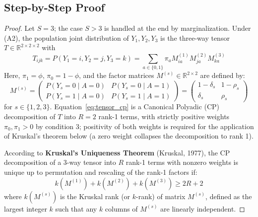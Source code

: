 \documentclass[11pt,a4paper]{article}
\begin{document}
\subsection{Step-by-Step Proof}
\begin{proof}
Let $S = 3$; the case $S > 3$ is handled at the end by marginalization. Under (A2), the population joint distribution of $Y_1, Y_2, Y_3$ is the three-way tensor $T \in \mathbb{R}^{2 \times 2 \times 2}$ with
\begin{equation}\label{eq:tensor_cp}
T_{ijk} = P(Y_1=i, Y_2=j, Y_3=k) = \sum_{a \in \{0, 1\}} \pi_a M^{(1)}_{ia} M^{(2)}_{ja} M^{(3)}_{ka}
\end{equation}
Here, $\pi_1 = \phi$, $\pi_0 = 1 - \phi$, and the factor matrices $M^{(s)} \in \mathbb{R}^{2 \times 2}$ are defined by:
\[
M^{(s)} = \begin{pmatrix} P(Y_s=0 \mid A=0) & P(Y_s=0 \mid A=1) \\ P(Y_s=1 \mid A=0) & P(Y_s=1 \mid A=1) \end{pmatrix} = \begin{pmatrix} 1-\delta_s & 1-\rho_s \\ \delta_s & \rho_s \end{pmatrix}
\]
for $s \in \{1, 2, 3\}$. Equation~\eqref{eq:tensor_cp} is a Canonical Polyadic (CP) decomposition of $T$ into $R = 2$ rank-1 terms, with strictly positive weights $\pi_0, \pi_1 > 0$ by condition 3; positivity of both weights is required for the application of Kruskal's theorem below (a zero weight collapses the decomposition to rank 1). %

According to \textbf{Kruskal's Uniqueness Theorem} (Kruskal, 1977), the CP decomposition of a 3-way tensor into $R$ rank-1 terms with nonzero weights is unique up to permutation and rescaling of the rank-1 factors if:
\begin{equation}\label{eq:kruskal_bound_formula}
k(M^{(1)}) + k(M^{(2)}) + k(M^{(3)}) \ge 2R + 2
\end{equation}
where $k(M^{(s)})$ is the Kruskal rank (or $k$-rank) of matrix $M^{(s)}$, defined as the largest integer $k$ such that any $k$ columns of $M^{(s)}$ are linearly independent.


\end{proof}
\end{document}

